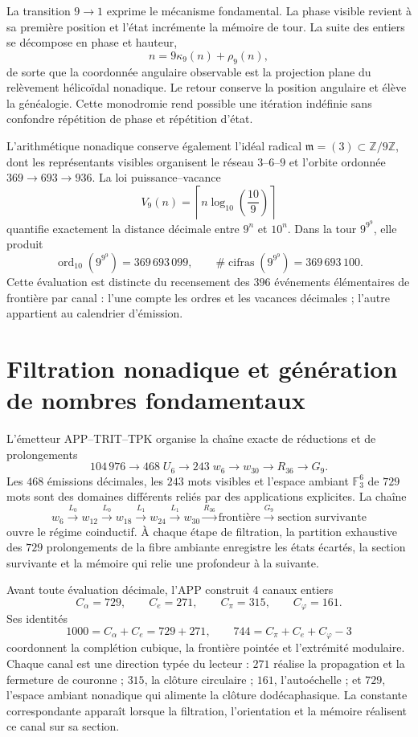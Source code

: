 La transition \(9\to1\) exprime le mécanisme fondamental. La phase visible
revient à sa première position et l'état incrémente la mémoire de tour.
La suite des entiers se décompose en phase et hauteur,
\[
 n=9\kappa_9(n)+\rho_9(n),
\]
de sorte que la coordonnée angulaire observable est la projection plane du
relèvement hélicoïdal nonadique. Le
retour conserve la position angulaire et élève la généalogie. Cette monodromie
rend possible une itération indéfinie sans confondre répétition de phase et
répétition d'état.

L'arithmétique nonadique conserve également l'idéal radical
\(\mathfrak m=(3)\subset\mathbb Z/9\mathbb Z\), dont les représentants
visibles organisent le réseau \(3\)--\(6\)--\(9\) et l'orbite ordonnée
\(369\to693\to936\). La loi puissance--vacance
\[
 V_9(n)=\left\lceil n\log_{10}\!\left(\frac{10}{9}\right)\right\rceil
\]
quantifie exactement la distance décimale entre \(9^n\) et \(10^n\). Dans
la tour \(9^{9^9}\), elle produit
\[
 \operatorname{ord}_{10}\!\left(9^{9^9}\right)=369\,693\,099,
 \qquad
 \#\operatorname{cifras}\!\left(9^{9^9}\right)=369\,693\,100.
\]
Cette évaluation est distincte du recensement des \(396\) événements élémentaires de
frontière par canal : l'une
compte les ordres et les vacances décimales ; l'autre appartient au calendrier
d'émission.

\section*{Filtration nonadique et génération de nombres fondamentaux}

L'émetteur APP--TRIT--TPK organise la chaîne exacte de réductions et de
prolongements
\[
 104\,976\longrightarrow468\;U_6\longrightarrow243\;w_6
 \longrightarrow w_{30}\longrightarrow R_{36}\longrightarrow G_9.
\]
Les \(468\) émissions décimales, les \(243\) mots visibles et l'espace ambiant
\(\mathbb F_3^6\) de \(729\) mots sont des domaines différents reliés par des
applications explicites. La chaîne
\[
 w_6\xrightarrow{L_0}w_{12}\xrightarrow{L_0}w_{18}
 \xrightarrow{L_1}w_{24}\xrightarrow{L_1}w_{30}
 \xrightarrow{R_{36}}\text{frontière}
 \xrightarrow{G_9}\text{section survivante}
\]
ouvre le régime coinductif. À chaque étape de filtration, la partition
exhaustive des \(729\) prolongements de la fibre ambiante enregistre les
états écartés, la section survivante et
la mémoire qui relie une profondeur à la suivante.

Avant toute évaluation décimale, l'APP construit \(4\) canaux entiers
\[
 C_\alpha=729,\qquad C_e=271,\qquad
 C_\pi=315,\qquad C_\varphi=161.
\]
Ses identités
\[
 1000=C_\alpha+C_e=729+271,
 \qquad
 744=C_\pi+C_e+C_\varphi-3
\]
coordonnent la complétion cubique, la frontière pointée et l'extrémité modulaire.
Chaque canal est une direction typée du lecteur : \(271\) réalise la propagation et la
fermeture de couronne ; \(315\), la clôture circulaire ; \(161\), l'autoéchelle ; et
\(729\), l'espace ambiant nonadique qui alimente la clôture dodécaphasique. La
constante correspondante apparaît lorsque la filtration, l'orientation et la
mémoire réalisent ce canal sur sa section.

